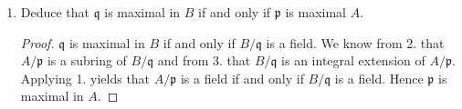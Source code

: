 \documentclass[a4paper]{article}
\begin{document}
\begin{enumerate}
\begin{proof}
\begin{align*}
      &(b + \mathfrak{q})^n + (a_{n-1} + \mathfrak{q}) (b + \mathfrak{q})^{n-1} + \cdots + (a_0 + \mathfrak{q}) \\
      =& (b^n + \mathfrak{q}) + (a_{n-1}b^{n-1} + \mathfrak{q}) + \cdots + (a_0 + \mathfrak{q}) \\
      =& b^n + a_{n-1}b^{n-1} + \cdots + a_0 + \mathfrak{q} \\
      =& 0 + \mathfrak{q} \text{,}
    \end{align*}
    so \(B/\mathfrak{q}\) is integral over \(A / \mathfrak{p}\).
  \end{proof}
  \newpage
  \item Deduce that \(\mathfrak{q}\) is maximal in \(B\) if and only if \(\mathfrak{p}\) is maximal \(A\).
  \begin{proof}
    \(\mathfrak{q}\) is maximal in \(B\) if and only if \(B/\mathfrak{q}\) is a field. We know from 2. that \(A/\mathfrak{p}\) is a subring of \(B/\mathfrak{q}\) and from 3. that \(B/\mathfrak{q}\) is an integral extension of \(A/\mathfrak{p}\). Applying 1. yields that \(A/\mathfrak{p}\) is a field if and only if \(B/\mathfrak{q}\) is a field. Hence \(\mathfrak{p}\) is maximal in \(A\).
  \end{proof}
\end{enumerate}
\newpage
\end{document}
